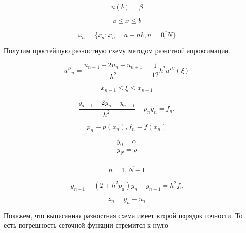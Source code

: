\begin{equation*}
    u(b) = \beta
\end{equation*}

\begin{equation*}
    a \le x \le b
\end{equation*}

\begin{equation*}
    \omega_n = \{ x_n : x_n = a + nh, n = \overline{0, N} \}
\end{equation*}

Получим простейшую разностную схему методом разнстной апроксимации.

\begin{equation*}
    u''_n = \frac{u_{n-1} - 2 u_n + u_{n+1}}{h^2} - \frac{1}{12} h^2
    u^{IV} (\xi)
\end{equation*}

\begin{equation*}
    x_{n-1} \le \xi \le x_{n+1}
\end{equation*}

\begin{equation*}
    \frac{y_{n-1} - 2 y_n + y_{n+1}}{h^2} - p_ny_n = f_n,
\end{equation*}

\begin{equation*}
    p_n = p(x_n), f_n = f(x_n)
\end{equation*}

\begin{equation*}
    \begin{matrix}
        y_0 = \alpha \\
        y_N = \rho \\
    \end{matrix}
\end{equation*}

\begin{equation*}
    n = \overline{1, N-1}
\end{equation*}

\begin{equation}\label{eq:diagonalmatrix}
    y_{n-1} - (2 + h^2 p_n) y_n + y_{n+1} = h^2 f_n
\end{equation}

\begin{equation*}
    z_n = y_n - u_n
\end{equation*}

Покажем, что выписанная разностная схема имеет второй порядок точности.
То есть погрешность сеточной функции стремится к нулю

